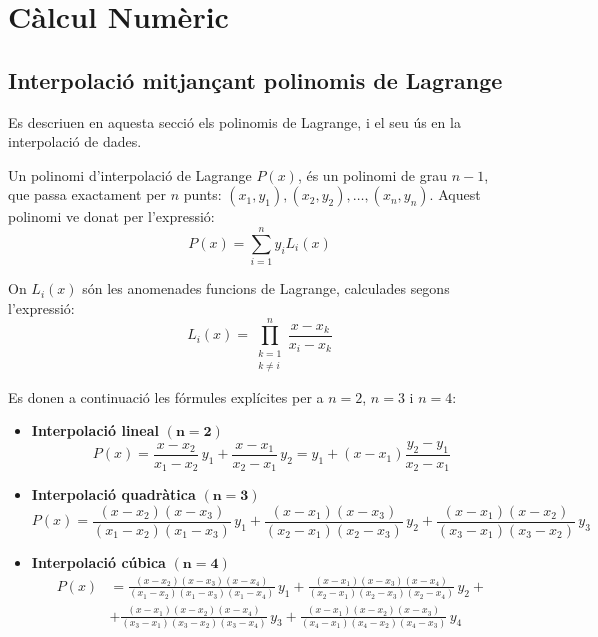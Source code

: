 \chapter{Càlcul Numèric} 

\section{Interpolació mitjançant polinomis de Lagrange}

Es descriuen en aquesta secció els polinomis de Lagrange, i el seu ús en la interpolació de dades.

Un polinomi d'interpolació de Lagrange $P(x)$, és un polinomi de grau $n-1$, que passa exactament per $n$ punts:
$(x_1, y_1), (x_2, y_2), \dots, (x_n, y_n)$. Aquest polinomi ve donat per l'expressió:
\begin{equation}
  P(x) = \sum_{i=1}^{n}  y_i L_i(x) \label{eq:poly_lag_1}
\end{equation}

On $L_i(x)$ són les anomenades funcions de Lagrange, calculades segons l'expressió:
\begin{equation}
  L_i(x) = \prod_{\substack{k=1 \\ k\neq i}}^{n} \frac{x-x_k}{x_i-x_k} \label{eq:poly_lag_2}
\end{equation}

Es donen a continuació les fórmules explícites per a $n = 2$, $n=3$ i $n=4$:

\begin{itemize}
    \item \textbf{Interpolació lineal} $\boldsymbol{(n=2)}$ 
    \begin{equation}\label{eq:interp_lin}
      P(x) = \frac{x-x_2}{x_1-x_2}\, y_1 + \frac{x-x_1}{x_2-x_1}\, y_2 = y_1 + (x-x_1) \frac{y_2-y_1}{x_2-x_1}
    \end{equation}

    \item \textbf{Interpolació quadràtica} $\boldsymbol{(n=3)}$ 
    \begin{equation}
      P(x) = \frac{(x-x_2)(x-x_3)}{(x_1-x_2)(x_1-x_3)}\, y_1 + \frac{(x-x_1)(x-x_3)}{(x_2-x_1)(x_2-x_3)}\, y_2 +
      \frac{(x-x_1)(x-x_2)}{(x_3-x_1)(x_3-x_2)}\, y_3
    \end{equation}

    \item \textbf{Interpolació cúbica} $\boldsymbol{(n=4)}$ 
    \begin{equation}\begin{split}\label{eq:interp_cub}
      P(x) &= \frac{(x-x_2)(x-x_3)(x-x_4)}{(x_1-x_2)(x_1-x_3)(x_1-x_4)}\, y_1 +
              \frac{(x-x_1)(x-x_3)(x-x_4)}{(x_2-x_1)(x_2-x_3)(x_2-x_4)}\, y_2 + {} \\[1.5ex]
           &+ \frac{(x-x_1)(x-x_2)(x-x_4)}{(x_3-x_1)(x_3-x_2)(x_3-x_4)}\, y_3 +
              \frac{(x-x_1)(x-x_2)(x-x_3)}{(x_4-x_1)(x_4-x_2)(x_4-x_3)}\, y_4
    \end{split}\end{equation}
\end{itemize}


